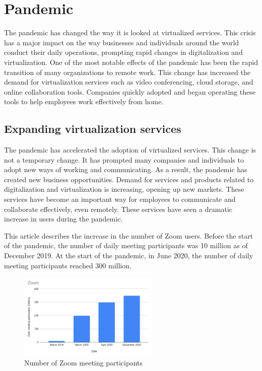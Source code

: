 \documentclass[12pt]{article}
\begin{document}
\section{Pandemic}
The pandemic has changed the way it is looked at virtualized services.
This crisis has a major impact on the way businesses and individuals around
the world conduct their daily operations, prompting rapid changes in
digitalization and virtualization. One of the most notable effects of the
pandemic has been the rapid transition of many organizations to remote work.
This change has increased the demand for virtualization services such as video
conferencing, cloud storage, and online collaboration tools. Companies quickly
adopted and began operating these tools to help employees work effectively from
home.

\subsection{Expanding virtualization services}
The pandemic has accelerated the adoption of virtualized
services. This change is not a temporary change. It has prompted many companies
and individuals to adopt new ways of working and communicating. As a result,
the pandemic has created new business opportunities. Demand for services and
products related to digitalization and virtualization is increasing, opening up
new markets. These services have become an important way for employees to
communicate and collaborate effectively, even remotely. These services have
seen a dramatic increase in users during the pandemic.

This article \cite{zoom_status} describes
the increase in the number of Zoom users. Before the start of the pandemic, the
number of daily meeting participants was 10 million as of December 2019. At the
start of the pandemic, in June 2020, the number of daily meeting participants
reached 300 million.

\begin{figure}[H]
    \centering
    \includegraphics[width=0.6\textwidth]{zoom.png}
    \caption{Number of Zoom meeting participants}
    \label{fig:my_label}
\end{figure}
\end{document}
